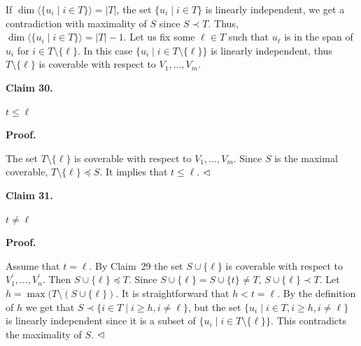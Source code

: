 If $\dim\langle\{u_{i}\mid i\in T\}\rangle=|T|$, the set $\{u_{i}\mid i\in T\}$ is linearly independent, we get a contradiction with maximality of $S$ since $S\prec T$. Thus, $\dim\langle\{u_{i}\mid i\in T\}\rangle=|T|-1$. Let us fix some $\ell\in T$ such that $u_{\ell}$ is in the span of $u_{i}$ for $i\in T\setminus\{\ell\}$. In this case $\{u_{i}\mid i\in T\setminus\{\ell\}\}$ is linearly independent, thus $T\setminus\{\ell\}$ is coverable with respect to $V_{1},\dots,V_{m}$.\par



\par\medskip\noindent\textbf{
Claim 30. 
}\par



$t\leq\ell$\par



\par\medskip\noindent\textbf{
Proof.}\par


The set $T\setminus\{\ell\}$ is coverable with respect to $V_{1},\dots,V_{m}$. Since $S$ is the maximal coverable, $T\setminus\{\ell\}\preceq S$. It implies that $t\leq\ell$.
$\hfill\vartriangleleft$\par



\par\medskip\noindent\textbf{
Claim 31. 
}\par



$t\neq\ell$\par



\par\medskip\noindent\textbf{
Proof.}\par


Assume that $t=\ell$. By Claim 29 the set $S\cup\{\ell\}$ is coverable with respect to $V_{1}^{\prime},\dots,V_{n}^{\prime}$. Then $S\cup\{\ell\}\preceq T$.
Since $S\cup\{\ell\}=S\cup\{t\}\neq T$, $S\cup\{\ell\}\prec T$.
Let $h=\max(T\setminus(S\cup\{\ell\})$. It is straightforward that $h<t=\ell$.
By the definition of $h$ we get that $S\prec\{i\in T\mid i\geq h,i\neq\ell\}$, but the set $\{u_{i}\mid i\in T,i\geq h,i\neq\ell\}$ is linearly independent since it is a subset of $\{u_{i}\mid i\in T\setminus\{\ell\}\}$. This contradicts the maximality of $S$.
$\hfill\vartriangleleft$\par



